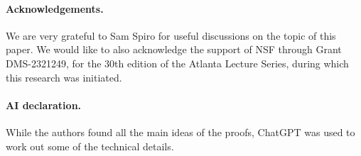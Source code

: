 \documentclass[12pt]{article}
\begin{document}
\medskip

\paragraph{Acknowledgements.} We are very grateful to Sam Spiro for useful discussions on the topic of this paper. We would like to also acknowledge the support of NSF through Grant DMS-2321249, for the $30$th edition of the Atlanta Lecture Series, during which this research was initiated.  

\paragraph{AI declaration.} While the authors found all the main ideas of the proofs, ChatGPT was used to work out some of the technical details.




\end{document}
